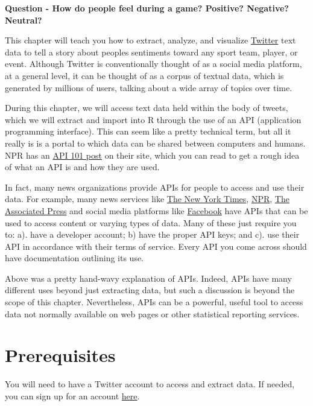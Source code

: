\documentclass[
]{book}
\begin{document}
\textbf{Question - How do people feel during a game? Positive? Negative? Neutral?}

This chapter will teach you how to extract, analyze, and visualize \href{www.twitter.com}{Twitter} text data to tell a story about peoples sentiments toward any sport team, player, or event. Although Twitter is conventionally thought of as a social media platform, at a general level, it can be thought of as a corpus of textual data, which is generated by millions of users, talking about a wide array of topics over time.

During this chapter, we will access text data held within the body of tweets, which we will extract and import into R through the use of an API (application programming interface). This can seem like a pretty technical term, but all it really is is a portal to which data can be shared between computers and humans. NPR has an \href{https://digitalservices.npr.org/post/api-101-what-api}{API 101 post} on their site, which you can read to get a rough idea of what an API is and how they are used.

In fact, many news organizations provide APIs for people to access and use their data. For example, many news services like \href{https://developer.nytimes.com/}{The New York Times}, \href{https://www.npr.org/api/index}{NPR}, \href{https://developer.ap.org/}{The Associated Press} and social media platforms like \href{https://developers.facebook.com/docs/apis-and-sdks/}{Facebook} have APIs that can be used to access content or varying types of data. Many of these just require you to: a). have a developer account; b) have the proper API keys; and c). use their API in accordance with their terms of service. Every API you come across should have documentation outlining its use.

Above was a pretty hand-wavy explanation of APIs. Indeed, APIs have many different uses beyond just extracting data, but such a discussion is beyond the scope of this chapter. Nevertheless, APIs can be a powerful, useful tool to access data not normally available on web pages or other statistical reporting services.

\hypertarget{prerequisites}{%
\section{Prerequisites}\label{prerequisites}}

You will need to have a Twitter account to access and extract data. If needed, you can sign up for an account \href{https://twitter.com/i/flow/signup}{here}.
\end{document}
